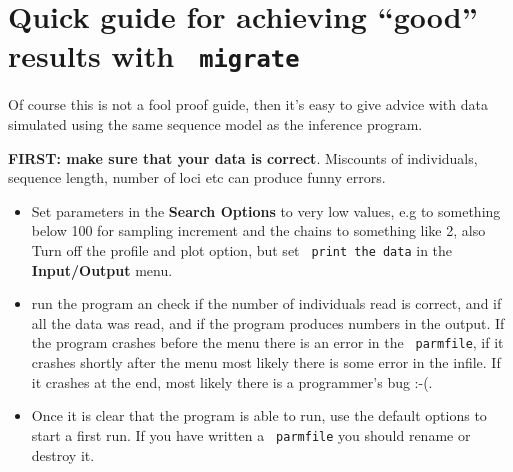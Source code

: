 \section{Quick guide for achieving ``good'' results with \texttt{ migrate}}
Of course this is not a fool proof guide, then it's easy to give advice with 
data simulated using the same sequence model as the inference program.
\par
\textbf{ FIRST: make sure that your data is correct}. Miscounts of individuals,
sequence length, number of loci etc can produce funny errors.
\begin{itemize}
\item Set parameters in the \textbf{ Search Options} to very low values, 
e.g to something
below 100 for sampling increment and the chains to something like 2, also
Turn off the profile and plot option, but set \texttt{ print the data}
 in the \textbf{ Input/Output} menu.
\item run the program an check if the number of individuals read is correct,
and if all the data was read, and if the program produces numbers 
in the output. If the program crashes before the menu there is an error 
in the \texttt{ parmfile}, if it crashes shortly after the menu most likely 
there is some error in
the infile. If it crashes at the end, most likely there is a programmer's 
bug :-(.
\item Once it is clear that the program is able to run, use the default options
to start a first run. If you have written a \texttt{ parmfile} you should rename 
or destroy it.
\end{itemize}

